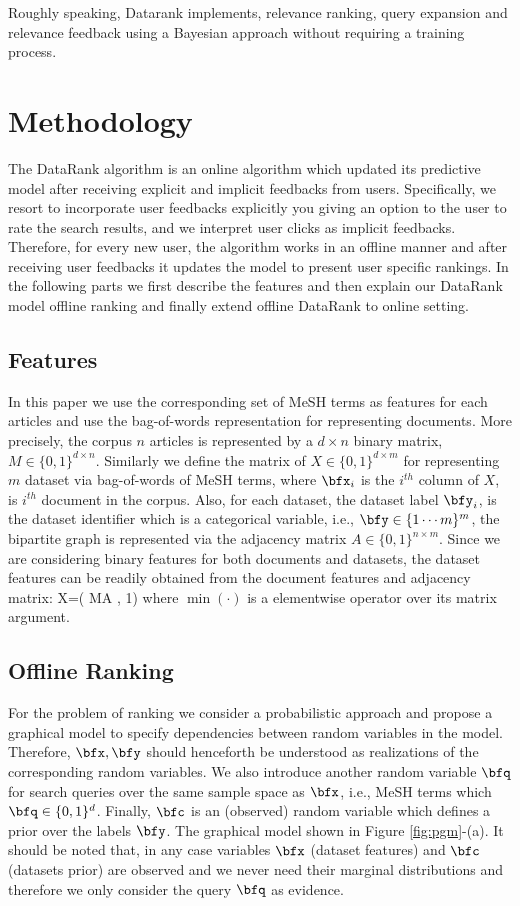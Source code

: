\documentclass[twoside,11pt]{article}
\begin{document}
Roughly speaking, Datarank implements, relevance ranking, query expansion and  relevance feedback using a Bayesian approach without requiring a training process.

\section{Methodology} \label{sec:methodology}
The DataRank algorithm is an online algorithm which updated its predictive model after receiving explicit and implicit feedbacks from users. Specifically, we resort to incorporate user feedbacks explicitly you giving an option to the user to rate the search results, and we interpret user clicks as implicit feedbacks. Therefore, for every new user, the algorithm works in an offline manner and after receiving user feedbacks it updates the model to present user specific rankings. In the following parts we first describe the features and then explain our DataRank model offline ranking and finally extend offline DataRank to online setting.

\subsection{Features}
In this paper we use the corresponding set of MeSH terms as features for each articles and use the bag-of-words representation for representing documents. More precisely, the corpus $n$ articles is represented by a $d \times n$ binary matrix, $M\in \{0,1\}^{d\times n}$. Similarly we define the matrix of $X\in \{0,1\}^{d\times m}$ for representing $m$ dataset via bag-of-words of MeSH terms, where $\bfx_i$ is the $i^{th}$ column of $X$, is $i^{th}$ document in the corpus. Also, for each dataset, the dataset  label $\bfy_i$, is the dataset identifier which is a categorical variable, i.e., $\bfy \in \{{1\cdots m}\}^m$, the bipartite graph is represented via the adjacency matrix $A\in \{0,1\}^{n\times m}$. Since we are considering binary features for both documents and datasets, the dataset features can be readily obtained from the document features and adjacency matrix:
\beq
X=\min( MA , 1)
\eeq
where $\min(\cdot)$ is a elementwise operator over its matrix argument.

\subsection{Offline Ranking}
For the problem of ranking we consider a probabilistic approach and propose a graphical model to specify dependencies between random variables in the model. Therefore, $\bfx, \bfy$ should henceforth be understood as realizations of the corresponding random variables.
We also introduce another random variable $\bfq$ for search queries over the same sample space as $\bfx$, i.e., MeSH terms which $\bfq \in\{0,1\}^{d}$.  Finally, $\bfc$ is an (observed) random variable which defines a prior over the labels $\bfy$.
The graphical model shown in Figure \ref{fig:pgm}-(a). It should be noted that, in any case variables $\bfx$ (dataset features) and $\bfc$ (datasets prior) are observed and we never need their marginal distributions and therefore we only consider the query $\bfq$ as evidence.
\end{document}

